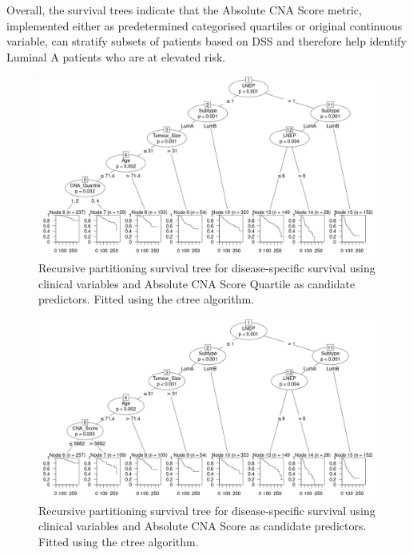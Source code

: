 Overall, the survival trees indicate that the Absolute CNA Score metric, implemented either as predetermined categorised quartiles or original continuous variable, can stratify subsets of patients based on DSS and therefore help identify Luminal A patients who are at elevated risk.  

\begin{figure}[!htb]
\centering
\includegraphics[width=\linewidth]{../figures/Chapter_3/LuminalAB_Ctree_DSS_Quart.png}
\caption[Recursive partitioning survival tree for disease-specific survival using clinical variables and Absolute CNA Score Quartile as candidate predictors (ctree).]{Recursive partitioning survival tree for disease-specific survival using clinical variables and Absolute CNA Score Quartile as candidate predictors. Fitted using the ctree algorithm.}
\label{fig:LumAB_Trees_Quart}
\end{figure}

\begin{figure}[!htb]
\centering
\includegraphics[width=\linewidth]{../figures/Chapter_3/LuminalAB_Ctree_DSS_Score.png}
\caption[Recursive partitioning survival tree for disease-specific survival using clinical variables and Absolute CNA Score as candidate predictors (ctree).]{Recursive partitioning survival tree for disease-specific survival using clinical variables and Absolute CNA Score as candidate predictors. Fitted using the ctree algorithm.}
\label{fig:LumAB_Trees_Score}
\end{figure}
\clearpage

